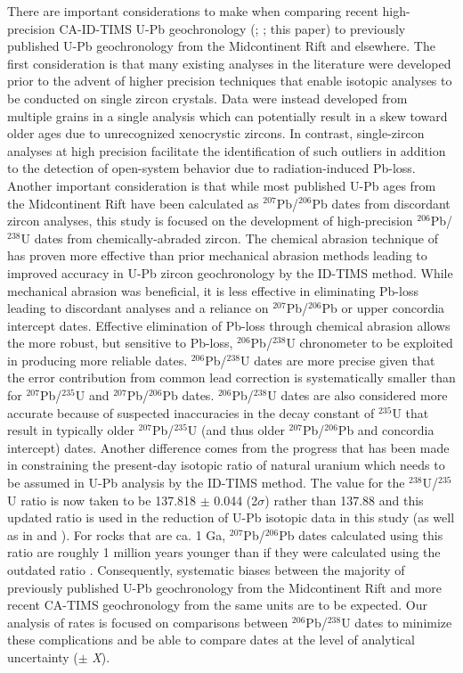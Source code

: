 \documentclass[11pt,letterpaper]{article}
\begin{document}
There are important considerations to make when comparing recent high-precision CA-ID-TIMS U-Pb geochronology (\citealp{Swanson-Hysell2014a}; \cite{Fairchild2017a}; this paper) to previously published U-Pb geochronology from the Midcontinent Rift and elsewhere. The first consideration is that many existing analyses in the literature were developed prior to the advent of higher precision techniques that enable isotopic analyses to be conducted on single zircon crystals. Data were instead developed from multiple grains in a single analysis which can potentially result in a skew toward older ages due to unrecognized xenocrystic zircons. In contrast, single-zircon analyses at high precision facilitate the identification of such outliers in addition to the detection of open-system behavior due to radiation-induced Pb-loss. Another important consideration is that while most published U-Pb ages from the Midcontinent Rift have been calculated as $^{207}$Pb/$^{206}$Pb dates from discordant zircon analyses, this study is focused on the development of high-precision $^{206}$Pb/$^{238}$U dates from chemically-abraded zircon. The chemical abrasion technique of \cite{Mattinson2005a} has proven more effective than prior mechanical abrasion methods \citep{Krogh1982a} leading to improved accuracy in U-Pb zircon geochronology by the ID-TIMS method. While mechanical abrasion was beneficial, it is less effective in eliminating Pb-loss leading to discordant analyses and a reliance on $^{207}$Pb/$^{206}$Pb or upper concordia intercept dates. Effective elimination of Pb-loss through chemical abrasion allows the more robust, but sensitive to Pb-loss, $^{206}$Pb/$^{238}$U chronometer to be exploited in producing more reliable dates. $^{206}$Pb/$^{238}$U dates are more precise given that the error contribution from common lead correction is systematically smaller than for $^{207}$Pb/$^{235}$U and $^{207}$Pb/$^{206}$Pb dates. $^{206}$Pb/$^{238}$U dates are also considered more accurate because of suspected inaccuracies in the decay constant of $^{235}$U \citep{Schoene2006a, Mattinson2010a} that result in typically older $^{207}$Pb/$^{235}$U (and thus older $^{207}$Pb/$^{206}$Pb and concordia intercept) dates. Another difference comes from the progress that has been made in constraining the present-day isotopic ratio of natural uranium which needs to be assumed in U-Pb analysis by the ID-TIMS method. The value for the $^{238}$U/$^{235}$U ratio is now taken to be 137.818 $\pm$ 0.044 (2$\sigma$) rather than 137.88 \citep{Hiess2012a} and this updated ratio is used in the reduction of U-Pb isotopic data in this study (as well as in \citealp{Swanson-Hysell2014a} and \citealp{Fairchild2017a}). For rocks that are ca. 1 Ga, $^{207}$Pb/$^{206}$Pb dates calculated using this ratio are roughly 1 million years younger than if they were calculated using the outdated ratio \citep{Hiess2012a}. Consequently, systematic biases between the majority of previously published U-Pb geochronology from the Midcontinent Rift and more recent CA-TIMS geochronology from the same units are to be expected. Our analysis of rates is focused on comparisons between $^{206}$Pb/$^{238}$U dates to minimize these complications and be able to compare dates at the level of analytical uncertainty ($\pm$ \textit{X}).
\end{document}
